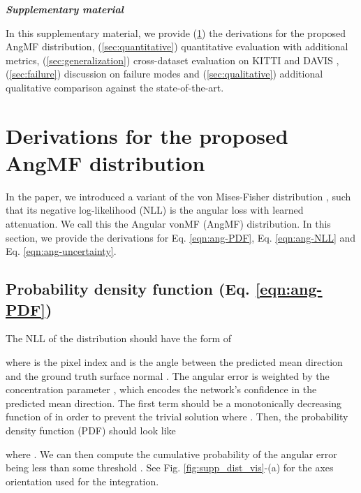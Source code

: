 \documentclass[10pt,twocolumn,letterpaper]{article}
\begin{document}
{\small


}

\appendix
\onecolumn

\noindent
\textit{\textbf{\large Supplementary material}}

\noindent
In this supplementary material, we provide (\ref{sec:derivation}) the derivations for the proposed AngMF distribution, (\ref{sec:quantitative}) quantitative evaluation with additional metrics, (\ref{sec:generalization}) cross-dataset evaluation on KITTI \cite{KITTI} and DAVIS \cite{DAVIS}, (\ref{sec:failure}) discussion on failure modes and (\ref{sec:qualitative}) additional qualitative comparison against the state-of-the-art.


\section{Derivations for the proposed AngMF distribution}
\label{sec:derivation}

In the paper, we introduced a variant of the von Mises-Fisher distribution \cite{fisher1993statistical}, such that its negative log-likelihood (NLL) is the angular loss with learned attenuation. We call this the Angular vonMF (AngMF) distribution. In this section, we provide the derivations for Eq. \ref{eqn:ang-PDF}, Eq. \ref{eqn:ang-NLL} and Eq. \ref{eqn:ang-uncertainty}.

\subsection{Probability density function (Eq. \ref{eqn:ang-PDF})}

The NLL of the distribution should have the form of



\noindent
where  is the pixel index and  is the angle between the predicted mean direction  and the ground truth surface normal . The angular error is weighted by the concentration parameter , which encodes the network's confidence in the predicted mean direction. The first term  should be a monotonically decreasing function of  in order to prevent the trivial solution where . Then, the probability density function (PDF) should look like



\noindent
where . We can then compute the cumulative probability of the angular error  being less than some threshold . See Fig. \ref{fig:supp_dist_vis}-(a) for the axes orientation used for the integration.
 
\end{document}
